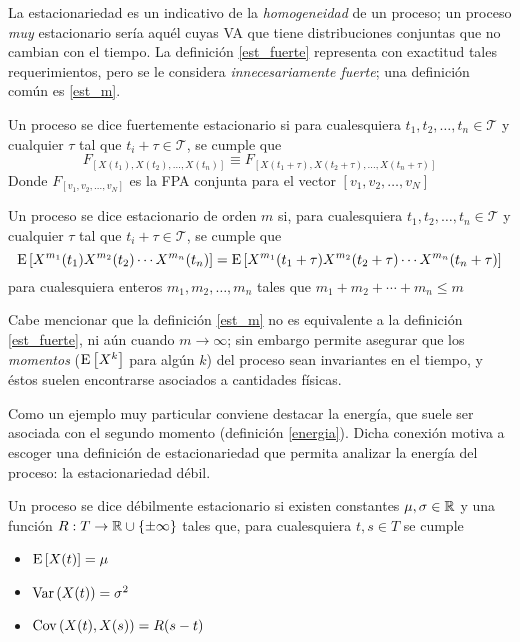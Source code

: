 La estacionariedad es un indicativo de la \textit{homogeneidad} de un proceso; un proceso 
\textit{muy} estacionario sería aquél cuyas VA que tiene distribuciones conjuntas que no cambian 
con el tiempo. 
%
La definición \ref{est_fuerte} representa con exactitud tales requerimientos, pero se le considera 
\textit{innecesariamente fuerte}; una definición común es \ref{est_m}.

\begin{definicion}
Un proceso \xt se dice fuertemente estacionario si para cualesquiera 
$t_1, t_2, \dots, t_n \in \mathcal{T}$ y cualquier $\tau$ tal que $t_i + \tau \in \mathcal{T}$,
se cumple que
\begin{equation*}
F_{\left[ X(t_1), X(t_2), \dots, X(t_n) \right]} \equiv
F_{\left[ X(t_1 + \tau), X(t_2 + \tau), \dots, X(t_n + \tau) \right]}
\end{equation*}
Donde $F_{[v_1,v_2,\dots,v_N]}$ es la FPA conjunta para el vector $[v_1,v_2,\dots,v_N]$
\label{est_fuerte}
\end{definicion}

\begin{definicion}
Un proceso \xt se dice estacionario de orden $m$ si, para cualesquiera
$t_1, t_2, \dots, t_n \in \mathcal{T}$ y cualquier $\tau$ tal que $t_i + \tau \in \mathcal{T}$,
se cumple que
\begin{equation*}
\mathrm{E}\left[ X^{m_1}(t_1)X^{m_2}(t_2)\cdots X^{m_n}(t_n) \right] =
\mathrm{E}\left[ X^{m_1}(t_1+\tau)X^{m_2}(t_2+\tau)\cdots X^{m_n}(t_n+\tau) \right]
\end{equation*}
para cualesquiera enteros $m_1, m_2, \dots, m_n$ tales que $m_1+m_2+\cdots+m_n \leq m$
\label{est_m}
\end{definicion}

Cabe mencionar que la definición \ref{est_m} no es equivalente a la definición \ref{est_fuerte}, ni
aún cuando $m\rightarrow \infty$; sin embargo permite asegurar que los \textit{momentos} 
($\mathrm{E}\left[ X^{k} \right]$ para algún $k$) del proceso sean invariantes en el tiempo, y éstos suelen encontrarse
asociados a cantidades físicas.

Como un ejemplo muy particular conviene destacar la energía, que suele ser asociada con el segundo
momento (definición \ref{energia}). 
%
Dicha conexión motiva a escoger una definición de estacionariedad que permita analizar la energía 
del proceso: la estacionariedad débil.

\begin{definicion}
Un proceso \xt se dice débilmente estacionario si existen constantes $\mu, \sigma \in \mathbb{R}$ y una 
función $R : T \rightarrow \mathbb{R} \cup \{ \pm \infty \} $ tales que, para cualesquiera $t, s \in T$ se 
cumple
\begin{itemize}
\item $\mathrm{E}\left[ X(t) \right] = \mu$
\item $\mathrm{Var}\left( X(t) \right) = \sigma^{2}$
\item $\mathrm{Cov}\left( X(t),X(s) \right) = R(s-t)$
\end{itemize}
\end{definicion}


